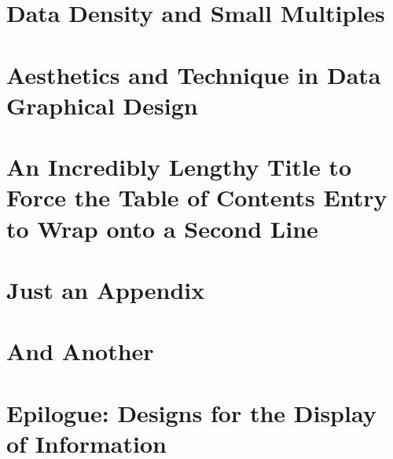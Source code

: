 \documentclass{bayeshyp}
\begin{document}
\chapter{Data Density and Small Multiples}
\setcounter{page}{161}

\chapter{Aesthetics and Technique in Data Graphical Design}
\setcounter{page}{177}

\chapter{An Incredibly Lengthy Title to Force the Table of Contents Entry to Wrap onto a Second Line}
\setcounter{page}{181}

\appendix

\chapter{Just an Appendix}
\setcounter{page}{183}

\chapter{And Another}
\setcounter{page}{185}

\backmatter
\chapter{Epilogue: Designs for the Display of Information}
\setcounter{page}{191}
\end{document}
